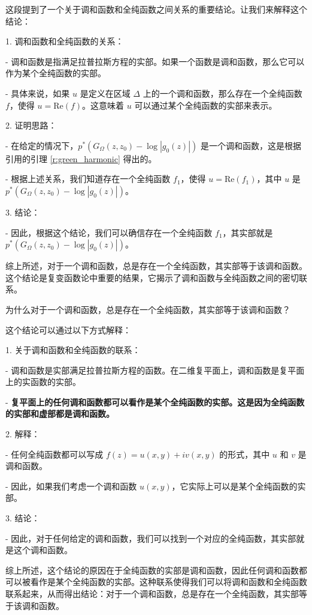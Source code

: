 \begin{tcolorbox}[colback=Emerald!10,colframe=cyan!40!black,breakable,title=\textbf{ANNOTATION}]
  这段提到了一个关于调和函数和全纯函数之间关系的重要结论。让我们来解释这个结论：

1. 调和函数和全纯函数的关系：

   - 调和函数是指满足拉普拉斯方程的实部。如果一个函数是调和函数，那么它可以作为某个全纯函数的实部。

   - 具体来说，如果 $u$ 是定义在区域 $\Delta$ 上的一个调和函数，那么存在一个全纯函数 $f$，使得 $u = \text{Re}(f)$。这意味着 $u$ 可以通过某个全纯函数的实部来表示。

2. 证明思路：

   - 在给定的情况下，$p^{*}(G_{\Omega}(z,z_{0})-\log|g_{0}(z)|)$ 是一个调和函数，这是根据引用的引理 \ref{r:green_harmonic} 得出的。

   - 根据上述关系，我们知道存在一个全纯函数 $f_{1}$，使得 $u = \text{Re}(f_{1})$，其中 $u$ 是 $p^{*}(G_{\Omega}(z,z_{0})-\log|g_{0}(z)|)$。

3. 结论：

   - 因此，根据这个结论，我们可以确信存在一个全纯函数 $f_{1}$，其实部就是 $p^{*}(G_{\Omega}(z,z_{0})-\log|g_{0}(z)|)$。

综上所述，对于一个调和函数，总是存在一个全纯函数，其实部等于该调和函数。这个结论是复变函数论中重要的结果，它揭示了调和函数与全纯函数之间的密切联系。


为什么对于一个调和函数，总是存在一个全纯函数，其实部等于该调和函数？

这个结论可以通过以下方式解释：

1. 关于调和函数和全纯函数的联系：

   - 调和函数是实部满足拉普拉斯方程的函数。在二维复平面上，调和函数是复平面上的实函数的实部。

   - \textbf{复平面上的任何调和函数都可以看作是某个全纯函数的实部。这是因为全纯函数的实部和虚部都是调和函数。}

2. 解释：

   - 任何全纯函数都可以写成 $f(z) = u(x, y) + iv(x, y)$ 的形式，其中 $u$ 和 $v$ 是调和函数。

   - 因此，如果我们考虑一个调和函数 $u(x, y)$，它实际上可以是某个全纯函数的实部。

3. 结论：

   - 因此，对于任何给定的调和函数，我们可以找到一个对应的全纯函数，其实部就是这个调和函数。

综上所述，这个结论的原因在于全纯函数的实部是调和函数，因此任何调和函数都可以被看作是某个全纯函数的实部。这种联系使得我们可以将调和函数和全纯函数联系起来，从而得出结论：对于一个调和函数，总是存在一个全纯函数，其实部等于该调和函数。
  \end{tcolorbox}

